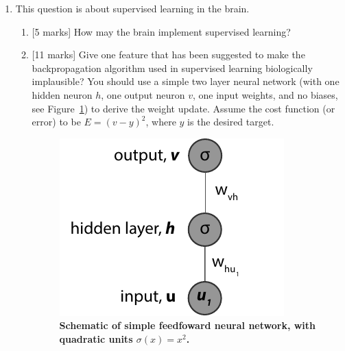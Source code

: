 \documentclass{article}
\newif\ifanswer
\begin{document}
\begin{enumerate}
\begin{enumerate}
\begin{enumerate}
\item{}[1 mark]  Which of the two models more accurately matches neural population data? [1 mark]

\ifanswer \textbf{Answer:} The K-pairwise model more accurately matches the data: it captures some higher-order correlations. Also, since the pairwise model is a special case of the K-pairwise (where all the $V$ terms equal zero), then the K-pairwise model must only do at least as well as or better than the pairwise model.\fi
  
\end{enumerate}

  \end{enumerate}


\item This question is about supervised learning in the brain.
\begin{enumerate}
\item{}[5 marks] How may the brain implement supervised learning?

  \ifanswer \textbf{Answer}: The classical example of supervised learning in the brain is in the cerebellum, where specific error signals appears to be computed [2.5 marks]. However, the cortex may also use some forms of supervised learning by relying on internally generated supervised signals, which may in turn use algorithms akin to the backpropagation algorithm to efficiently update synaptic weights [2.5 marks].\\
  \fi


\item{}[11 marks] Give one feature that has been suggested to make the backpropagation algorithm used in supervised learning biologically implausible? You should use a simple two layer neural network (with one hidden neuron $h$, one output neuron $v$, one input weights, and no biases, see Figure~\ref{fig:backprop_ff}) to derive the weight update. Assume the cost function (or error) to be $E = (v-y)^2$, where $y$ is the desired target.

\begin{figure}[htb!]
  \centering
  \includegraphics[width=0.4\linewidth]{backprop_ff}
  \caption{\textbf{Schematic of simple feedfoward neural network, with quadratic units $\sigma (x) = x^2$.}}
  \label{fig:backprop_ff}
\end{figure}


\end{enumerate}
\end{enumerate}
\end{document}
